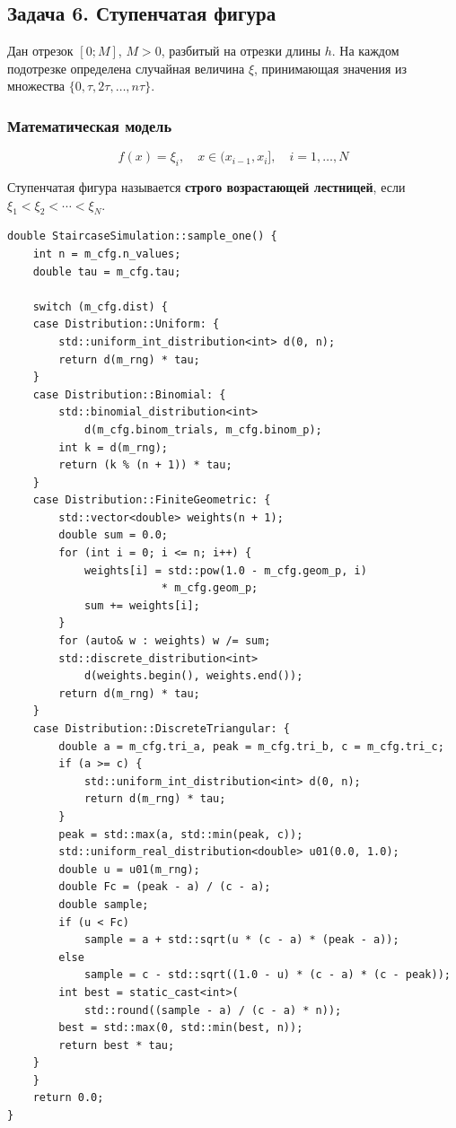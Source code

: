 \documentclass[14pt]{extarticle}
\begin{document}
\clearpage
\subsection{Задача 6. Ступенчатая фигура}
\label{sec:orgaa98f19}

Дан отрезок \([0; M]\), \(M > 0\), разбитый на отрезки длины \(h\). На каждом подотрезке определена случайная величина \(\xi\), принимающая значения из множества \(\{0, \tau, 2\tau, \ldots, n\tau\}\).
\subsubsection{Математическая модель}
\label{sec:org53b62ef}

$$f(x) = \xi_i, \quad x \in (x_{i-1}, x_i], \quad i = 1, \ldots, N$$

Ступенчатая фигура называется \textbf{строго возрастающей лестницей}, если \(\xi_1 < \xi_2 < \cdots < \xi_N\).

\begin{listing}[htbp]
\caption{Генерация одного значения \(\xi_i\)}
\begin{verbatim}
double StaircaseSimulation::sample_one() {
    int n = m_cfg.n_values;
    double tau = m_cfg.tau;

    switch (m_cfg.dist) {
    case Distribution::Uniform: {
        std::uniform_int_distribution<int> d(0, n);
        return d(m_rng) * tau;
    }
    case Distribution::Binomial: {
        std::binomial_distribution<int>
            d(m_cfg.binom_trials, m_cfg.binom_p);
        int k = d(m_rng);
        return (k % (n + 1)) * tau;
    }
    case Distribution::FiniteGeometric: {
        std::vector<double> weights(n + 1);
        double sum = 0.0;
        for (int i = 0; i <= n; i++) {
            weights[i] = std::pow(1.0 - m_cfg.geom_p, i)
                        * m_cfg.geom_p;
            sum += weights[i];
        }
        for (auto& w : weights) w /= sum;
        std::discrete_distribution<int>
            d(weights.begin(), weights.end());
        return d(m_rng) * tau;
    }
    case Distribution::DiscreteTriangular: {
        double a = m_cfg.tri_a, peak = m_cfg.tri_b, c = m_cfg.tri_c;
        if (a >= c) {
            std::uniform_int_distribution<int> d(0, n);
            return d(m_rng) * tau;
        }
        peak = std::max(a, std::min(peak, c));
        std::uniform_real_distribution<double> u01(0.0, 1.0);
        double u = u01(m_rng);
        double Fc = (peak - a) / (c - a);
        double sample;
        if (u < Fc)
            sample = a + std::sqrt(u * (c - a) * (peak - a));
        else
            sample = c - std::sqrt((1.0 - u) * (c - a) * (c - peak));
        int best = static_cast<int>(
            std::round((sample - a) / (c - a) * n));
        best = std::max(0, std::min(best, n));
        return best * tau;
    }
    }
    return 0.0;
}
\end{verbatim}
\end{listing}
\end{document}
